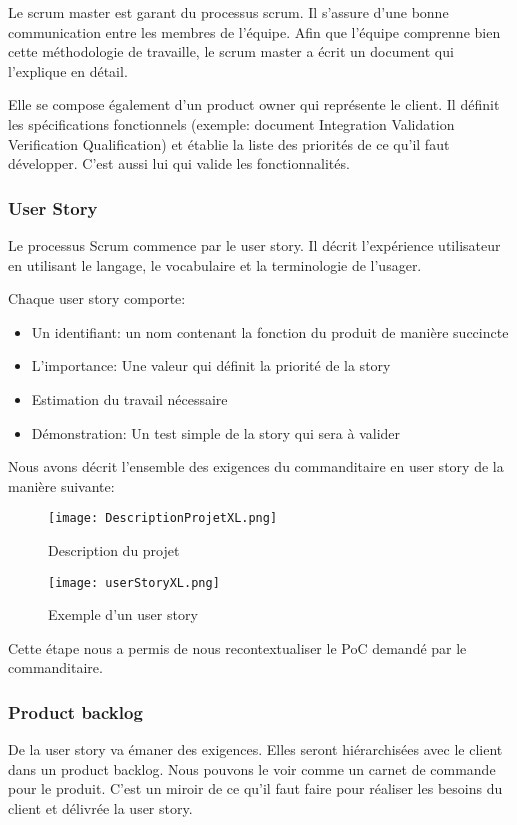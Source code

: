 Le scrum master est garant du processus scrum.
Il s'assure d’une bonne communication entre les membres de l'équipe.
Afin que l'équipe comprenne bien cette méthodologie de travaille, le scrum master a écrit un document qui l'explique en détail.

Elle se compose également d'un product owner qui représente le client.
Il définit les spécifications fonctionnels (exemple:  document Integration Validation Verification Qualification) et établie la liste des priorités de ce qu'il faut développer.
C'est aussi lui qui valide les fonctionnalités.



\subsubsection{User Story}
Le processus Scrum commence par le user story.
Il décrit l'expérience utilisateur en utilisant le langage, le vocabulaire et la terminologie de l'usager.   

Chaque user story comporte: 
\begin{itemize}
    \item Un identifiant: un nom contenant la fonction du produit de manière succincte  
    \item L'importance: Une valeur qui définit la priorité de la story  
    \item Estimation du travail nécessaire
    \item Démonstration: Un test simple de la story qui sera à valider   
\end{itemize}

Nous avons décrit l'ensemble des exigences du commanditaire en user story de la manière suivante: 
\begin{figure}[h!]
  \centering
  \texttt{[image: DescriptionProjetXL.png]}
	\caption[]{Description du projet}
	\label{}
\end{figure}

\begin{figure}[h!]
  \centering
  \texttt{[image: userStoryXL.png]}
	\caption[]{Exemple d’un user story}
	\label{}
\end{figure}

Cette étape nous a permis de nous recontextualiser le PoC demandé par le commanditaire. 


\subsubsection{Product backlog}
De la user story va émaner des exigences.
Elles seront hiérarchisées avec le client dans un product backlog.
Nous pouvons le voir comme un carnet de commande pour le produit. 
C'est un miroir de ce qu'il faut faire pour réaliser les besoins du client et délivrée la user story.  

